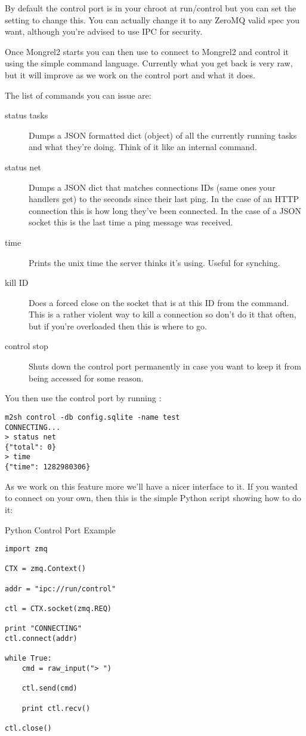 By default the control port is in your chroot at run/control but you can set
the setting  to change this.  You can actually change it 
to any ZeroMQ valid spec you want, although you're advised to use IPC for security.

Once Mongrel2 starts you can then use  to connect to Mongrel2 and 
control it using the simple command language.  Currently what you get back is
very raw, but it will improve as we work on the control port and what it does.

The list of commands you can issue are:

\begin{description}
\item[status tasks] Dumps a JSON formatted dict (object) of all the currently
    running tasks and what they're doing.  Think of it like an internal 
    command.
\item[status net] Dumps a JSON dict that matches connections IDs (same ones your
        handlers get) to the seconds since their last ping.  In the case of an
        HTTP connection this is how long they've been connected.  In the case
        of a JSON socket this is the last time a ping message was received.
\item[time] Prints the unix time the server thinks it's using.  Useful for synching.
\item[kill ID] Does a forced close on the socket that is at this ID from the 
    command.  This is a rather violent way to kill a connection so don't do it that
    often, but if you're overloaded then this is where to go.
\item[control stop] Shuts down the control port permanently in case you want to keep
    it from being accessed for some reason.
\end{description}

You then use the control port by running :

\begin{Verbatim}
m2sh control -db config.sqlite -name test
CONNECTING...
> status net
{"total": 0}
> time
{"time": 1282980306}
\end{Verbatim}

As we work on this feature more we'll have a nicer interface to it.
If you wanted to connect on your own, then this is the simple Python
script showing how to do it:


\begin{code}{Python Control Port Example}
\begin{lstlisting}
import zmq

CTX = zmq.Context()

addr = "ipc://run/control"

ctl = CTX.socket(zmq.REQ)

print "CONNECTING"
ctl.connect(addr)

while True:
    cmd = raw_input("> ")

    ctl.send(cmd)

    print ctl.recv()

ctl.close()
\end{lstlisting}
\end{code}

